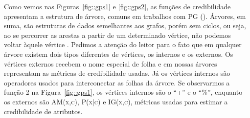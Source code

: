 
Como vemos nas Figuras~\ref{fig::gps1} e \ref{fig::gps2}, as funções de credibilidade apresentam a estrutura de árvore, comuns em trabalhos com \textsc{PG} (\cite{Koza92}).
Árvores, em suma, são estruturas de dados semelhantes aos grafos, porém sem ciclos, ou seja, ao se percorrer as arestas a partir de um determinado vértice, não podemos voltar àquele vértice
.
Pedimos a atenção do leitor para o fato que em qualquer árvore existem dois tipos diferentes de vértices, os internos e os externos.
Os vértices externos recebem o nome especial de folha e em nossas árvores representam as métricas de credibilidade usadas.
Já os vértices internos são operadores usados para interconectar as folhas da árvore. Se observarmos a função 2 na Figura~\ref{fig::gps1}, os vértices internos são o ``+'' e o ``\%'', enquanto os externos são \textsc{AM(x,c)}, \textsc{P(x|c)} e \textsc{IG(x,c)}, métricas usadas para estimar a credibilidade de atributos.

